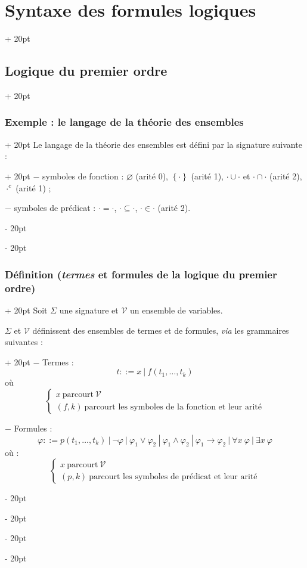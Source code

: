 \documentclass[a4paper, 12pt, twoside]{article}
\newcommand{\set}[1]{\left\{ #1 \right\}}
\newcommand{\eqsys}[2]{\begin{cases} #1 \\ #2 \end{cases}}
\newcommand{\ind}[1][20pt]{\advance\leftskip + #1}
\newcommand{\deind}[1][20pt]{\advance\leftskip - #1}
\newenvironment{indt}[2][20pt]{#2 \par \ind[#1]}{\par \deind} %
\begin{document}
\begin{indt}{\section{Syntaxe des formules logiques}}
\begin{indt}{\subsection{Logique du premier ordre}}
            \vspace{12pt}
            
            \begin{indt}{\subsubsection{Exemple : le langage de la théorie des ensembles}}
                \begin{indt}{Le langage de la théorie des ensembles est défini par la signature suivante :}
                    $-$ symboles de fonction : $\varnothing$ (arité 0), $\set \cdot$ (arité 1), $\cdot \cup \cdot$ et $\cdot \cap \cdot$ (arité 2), $\cdot^c$ (arité 1) ;
                    
                    $-$ symboles de prédicat : $\cdot = \cdot$, $\cdot \subseteq \cdot$, $\cdot \in \cdot$ (arité 2).
                \end{indt}
            \end{indt}
            
            \vspace{12pt}
            
            \begin{indt}{\subsubsection{Définition (\textit{termes} et formules de la logique du premier ordre)}}
                Soit $\Sigma$ une signature et $\mathcal V$ un ensemble de variables.
                
                \begin{indt}{$\Sigma$ et $\mathcal V$ définissent des ensembles de termes et de formules, \textit{via} les grammaires suivantes :}
                    $-$ Termes :
                        \[
                            t ::= x\ |\ f(t_1, \ldots, t_k)
                        \]
                    où
                        \[
                            \eqsys{x\ \text{parcourt}\ \mathcal V}{(f, k)\ \text{parcourt les symboles de la fonction et leur arité}}
                        \]
                    
                    $-$ Formules :
                        \[
                            \varphi ::=
                            p(t_1, \ldots, t_k)\
                            |\ \neg \varphi\
                            |\ \varphi_1 \vee \varphi_2\
                            |\ \varphi_1 \wedge \varphi_2\
                            |\ \varphi_1 \rightarrow \varphi_2\
                            |\ \forall x\ \varphi\
                            |\ \exists x\ \varphi
                        \]
                    où :
                        \[
                            \eqsys{x\ \text{parcourt}\ \mathcal V}{(p, k)\ \text{parcourt les symboles de prédicat et leur arité}}
                        \]
                \end{indt}
                

\end{indt}
\end{indt}
\end{indt}
\end{document}

